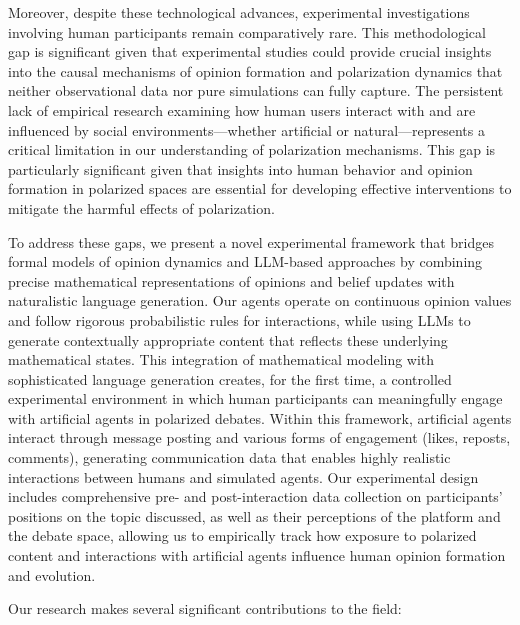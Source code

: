 Moreover, despite these technological advances, experimental investigations involving human participants remain comparatively rare. This methodological gap is significant given that experimental studies could provide crucial insights into the causal mechanisms of opinion formation and polarization dynamics that neither observational data nor pure simulations can fully capture. The persistent lack of empirical research examining how human users interact with and are influenced by social environments---whether artificial or natural---represents a critical limitation in our understanding of polarization mechanisms. This gap is particularly significant given that insights into human behavior and opinion formation in polarized spaces are essential for developing effective interventions to mitigate the harmful effects of polarization.

To address these gaps, we present a novel experimental framework that bridges formal models of opinion dynamics and LLM-based approaches by combining precise mathematical representations of opinions and belief updates with naturalistic language generation. Our agents operate on continuous opinion values and follow rigorous probabilistic rules for interactions, while using LLMs to generate contextually appropriate content that reflects these underlying mathematical states. This integration of mathematical modeling with sophisticated language generation creates, for the first time, a controlled experimental environment in which human participants can meaningfully engage with artificial agents in polarized debates. Within this framework, artificial agents interact through message posting and various forms of engagement (likes, reposts, comments), generating communication data that enables highly realistic interactions between humans and simulated agents. Our experimental design includes comprehensive pre- and post-interaction data collection on participants' positions on the topic discussed, as well as their perceptions of the platform and the debate space, allowing us to empirically track how exposure to polarized content and interactions with artificial agents influence human opinion formation and evolution.

Our research makes several significant contributions to the field:

